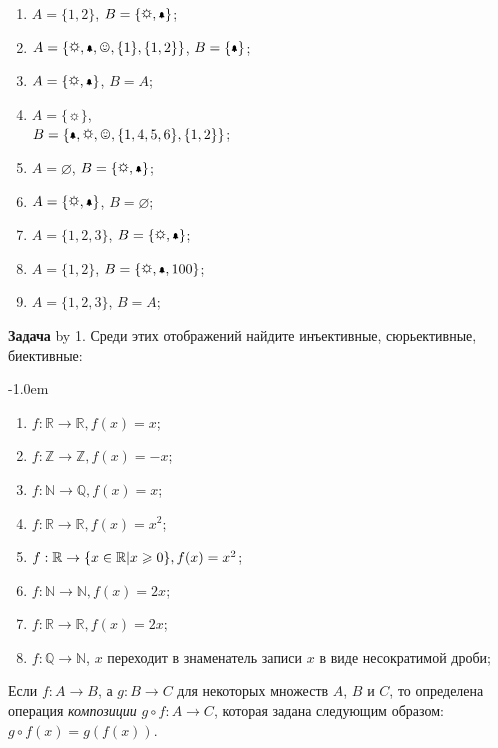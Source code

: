 \documentclass[a4paper,10pt]{article}
\def\problem{\textbf{Задача \the\problemnum}\advance\problemnum by 1}
\begin{document}
\begin{multicols}{3}
	\begin{enumerate}[label=(\arabic*)\,]
		\item $A=\{1,2\}$, $B=\{\sun,\bell\}$;
		\item $A=\{\sun,\bell,\smiley, \{1\}, \{1,2\}\}$, $B=\{\bell\}$;
		\item $A=\{\sun,\bell\}$, $B=A$;
		\item $A=\{\sun\}$,\\ $B=\{\bell,\sun,\smiley, \{1,4,5,6\}, \{1,2\}\}$;
		\item $A=\varnothing$, $B=\{\sun,\bell\}$;
		\item $A=\{\sun,\bell\}$, $B=\varnothing$;
		\item $A=\{1,2,3\}$, $B=\{\sun,\bell\}$;
		\item $A=\{1,2\}$, $B=\{\sun,\bell,100\}$;
		\item $A=\{1,2,3\}$, $B=A$;
	\end{enumerate}
\end{multicols}

\problem. Среди этих отображений найдите инъективные, сюрьективные, биективные: \par\kern-1.0em
\begin{multicols}{3}
	\begin{enumerate}[label=(\arabic*)\,]
		\item $f:\mathbb R\to\mathbb R, f(x)=x$;
		\item $f:\mathbb Z\to\mathbb Z, f(x)=-x$;
		\item $f:\mathbb N\to\mathbb Q, f(x)=x$;
		\item $f:\mathbb R\to\mathbb R, f(x)=x^2$;
		\item $f:\mathbb R\to\mathbb \{x\in\mathbb R|x\geqslant 0\}, f(x)=x^2$;
		\item $f:\mathbb N\to\mathbb N, f(x)=2x$;
		\item $f:\mathbb R\to\mathbb R, f(x)=2x$;
		\item $f:\mathbb Q\to\mathbb N$, $x$ переходит в знаменатель записи $x$ в виде несократимой дроби;
	\end{enumerate}
\end{multicols}

Если $f:A\to B$, а $g: B\to C$ для некоторых множеств $A$, $B$ и $C$, то определена операция \textit{композиции} $g\circ f: A\to C$, которая задана следующим образом: $g\circ f(x) = g(f(x))$.
\end{document}
